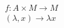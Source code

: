 \begin {eqnarray} \label{eq1}
f:A \times M \rightarrow M \\
(\lambda, x) \rightarrow \lambda x \nonumber
\end {eqnarray}

